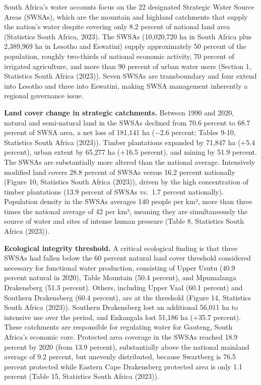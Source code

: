 \documentclass[
  letterpaper,
  DIV=11,
  numbers=noendperiod]{scrartcl}
\begin{document}
South Africa's water accounts focus on the 22 designated Strategic Water
Source Areas (SWSAs), which are the mountain and highland catchments
that supply the nation's water despite covering only 8.2 percent of
national land area (Statistics South Africa, 2023). The SWSAs
(10,020,720 ha in South Africa plus 2,389,969 ha in Lesotho and
Eswatini) supply approximately 50 percent of the population, roughly
two-thirds of national economic activity, 70 percent of irrigated
agriculture, and more than 90 percent of urban water users (Section 1,
Statistics South Africa (2023)). Seven SWSAs are transboundary and four
extend into Lesotho and three into Eswatini, making SWSA management
inherently a regional governance issue.

\textbf{Land cover change in strategic catchments.} Between 1990 and
2020, natural and semi-natural land in the SWSAs declined from 70.6
percent to 68.7 percent of SWSA area, a net loss of 181,141 ha (−2.6
percent; Tables 9-10, Statistics South Africa (2023)). Timber
plantations expanded by 71,847 ha (+5.4 percent), urban extent by 65,277
ha (+16.5 percent), and mining by 51.9 percent. The SWSAs are
substantially more altered than the national average. Intensively
modified land covers 28.8 percent of SWSAs versus 16.2 percent
nationally (Figure 10, Statistics South Africa (2023)), driven by the
high concentration of timber plantations (13.9 percent of SWSAs vs.~1.7
percent nationally). Population density in the SWSAs averages 140 people
per km², more than three times the national average of 42 per km²,
meaning they are simultaneously the source of water and sites of intense
human pressure (Table 8, Statistics South Africa (2023)).

\textbf{Ecological integrity threshold.} A critical ecological finding
is that three SWSAs had fallen below the 60 percent natural land cover
threshold considered necessary for functional water production,
consisting of Upper Usutu (40.9 percent natural in 2020), Table Mountain
(50.4 percent), and Mpumalanga Drakensberg (51.3 percent). Others,
including Upper Vaal (60.1 percent) and Southern Drakensberg (60.4
percent), are at the threshold (Figure 14, Statistics South Africa
(2023)). Southern Drakensberg lost an additional 56,011 ha to intensive
use over the period, and Enkangala lost 51,186 ha (+35.7 percent). These
catchments are responsible for regulating water for Gauteng, South
Africa's economic core. Protected area coverage in the SWSAs reached
18.9 percent by 2020 (from 13.9 percent), substantially above the
national mainland average of 9.2 percent, but unevenly distributed,
because Swartberg is 76.5 percent protected while Eastern Cape
Drakensberg protected area is only 1.1 percent (Table 15, Statistics
South Africa (2023)).
\end{document}
